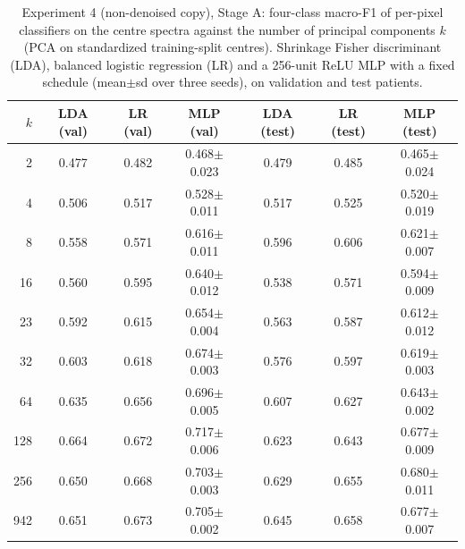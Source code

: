 \begin{table}[htbp]\centering\scriptsize
\caption{Experiment 4 (non-denoised copy), Stage A: four-class macro-F1 of per-pixel classifiers on the centre spectra against the number of principal components $k$ (PCA on standardized training-split centres). Shrinkage Fisher discriminant (LDA), balanced logistic regression (LR) and a 256-unit ReLU MLP with a fixed schedule (mean$\pm$sd over three seeds), on validation and test patients.}\label{tab:exp4_pixel_nodenoise}
\begin{tabular}{rcccccc}\toprule
$k$ & LDA (val) & LR (val) & MLP (val) & LDA (test) & LR (test) & MLP (test) \\ \midrule
2 & 0.477 & 0.482 & 0.468$\pm$0.023 & 0.479 & 0.485 & 0.465$\pm$0.024 \\
4 & 0.506 & 0.517 & 0.528$\pm$0.011 & 0.517 & 0.525 & 0.520$\pm$0.019 \\
8 & 0.558 & 0.571 & 0.616$\pm$0.011 & 0.596 & 0.606 & 0.621$\pm$0.007 \\
16 & 0.560 & 0.595 & 0.640$\pm$0.012 & 0.538 & 0.571 & 0.594$\pm$0.009 \\
23 & 0.592 & 0.615 & 0.654$\pm$0.004 & 0.563 & 0.587 & 0.612$\pm$0.012 \\
32 & 0.603 & 0.618 & 0.674$\pm$0.003 & 0.576 & 0.597 & 0.619$\pm$0.003 \\
64 & 0.635 & 0.656 & 0.696$\pm$0.005 & 0.607 & 0.627 & 0.643$\pm$0.002 \\
128 & 0.664 & 0.672 & 0.717$\pm$0.006 & 0.623 & 0.643 & 0.677$\pm$0.009 \\
256 & 0.650 & 0.668 & 0.703$\pm$0.003 & 0.629 & 0.655 & 0.680$\pm$0.011 \\
942 & 0.651 & 0.673 & 0.705$\pm$0.002 & 0.645 & 0.658 & 0.677$\pm$0.007 \\
\bottomrule\end{tabular}\end{table}
